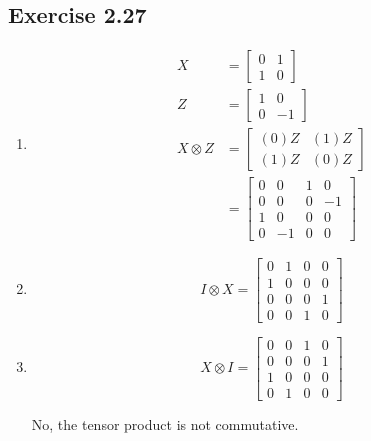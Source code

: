 \documentclass{article}
\begin{document}
\subsection*{Exercise 2.27}

\begin{enumerate}
  \item

        \begin{align*}
          X           & = \begin{bmatrix}
                            0 & 1 \\
                            1 & 0
                          \end{bmatrix}  \\
          Z           & = \begin{bmatrix}
                            1 & 0  \\
                            0 & -1
                          \end{bmatrix}  \\
          X \otimes Z & = \begin{bmatrix}
                            (0) Z & (1) Z \\
                            (1) Z & (0) Z
                          \end{bmatrix}  \\
                      & = \begin{bmatrix}
                            0 & 0  & 1 & 0  \\
                            0 & 0  & 0 & -1 \\
                            1 & 0  & 0 & 0  \\
                            0 & -1 & 0 & 0
                          \end{bmatrix}
        \end{align*}

  \item

        \[I \otimes X = \begin{bmatrix}
            0 & 1 & 0 & 0 \\
            1 & 0 & 0 & 0 \\
            0 & 0 & 0 & 1 \\
            0 & 0 & 1 & 0
          \end{bmatrix}\]

  \item

        \[X \otimes I = \begin{bmatrix}
            0 & 0 & 1 & 0 \\
            0 & 0 & 0 & 1 \\
            1 & 0 & 0 & 0 \\
            0 & 1 & 0 & 0
          \end{bmatrix}\]

        No, the tensor product is not commutative.
\end{enumerate}
\end{document}
